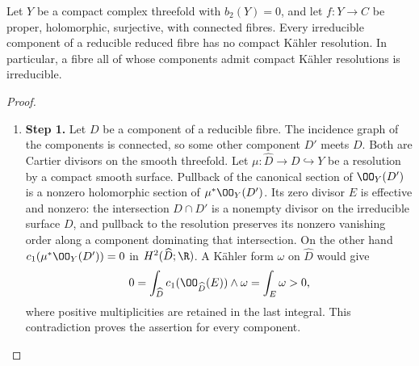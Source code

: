 \begin{proposition}\hypertarget{tag-01FA}{}\label{cdp:st:C.3.4}

Let $Y$ be a compact complex threefold with $b_2(Y)=0$, and let
$f:Y\to C$ be proper, holomorphic, surjective, with connected fibres.
Every irreducible component of a reducible reduced fibre has no
compact K\"ahler resolution. In particular, a fibre all of whose
components admit compact K\"ahler resolutions is irreducible.
\end{proposition}


\begin{proof}
\begin{enumerate}[label={$\langle1\rangle$\arabic*.},leftmargin=*]
\item 
\noindent\textbf{Step 1.} Let $D$ be a component of a reducible fibre. The incidence graph of
the components is connected, so some other component $D'$ meets $D$.
Both are Cartier divisors on the smooth threefold. Let
$\mu:\widehat D\to D\hookrightarrow Y$ be a resolution by a compact
smooth surface. Pullback of the canonical section of $\OO_Y(D')$
is a nonzero holomorphic section of $\mu^*\OO_Y(D')$. Its zero
divisor $E$ is effective and nonzero: the intersection $D\cap D'$
is a nonempty divisor on the irreducible surface $D$, and pullback
to the resolution preserves its nonzero vanishing order along a
component dominating that intersection. On the other hand
$c_1(\mu^*\OO_Y(D'))=0$ in $H^2(\widehat D;\R)$.
A K\"ahler form $\omega$ on $\widehat D$ would give
\[
0=\int_{\widehat D}c_1(\OO_{\widehat D}(E))\wedge\omega
 =\int_E\omega>0,
\]
where positive multiplicities are retained in the last integral.
This contradiction proves the assertion for every component.

\end{enumerate}
\end{proof}